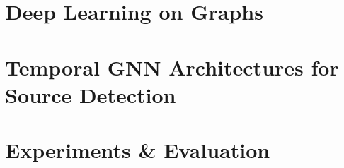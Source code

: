 \documentclass[11pt,a4paper,oneside]{report}
\begin{document}
\part{Deep Learning on Graphs}



\part{Temporal GNN Architectures for Source Detection}





\part{Experiments \& Evaluation}

% 
\end{document}
